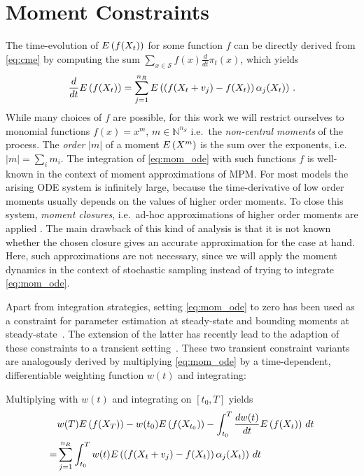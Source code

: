 \section{Moment Constraints}\label{sec:cv:moments}
The time-evolution of ${E}\left(f(X_t)\right)$ for some function $f$ can be directly derived from \eqref{eq:cme} by 
computing the sum
$\sum_{x\in\mathcal{S}}f(x)\frac{d}{dt}\pi_t(x)$, which yields 
\begin{equation}\label{eq:mom_ode}
    \frac{d}{dt}{E}\left(f(X_t)\right) = \sum_{j=1}^{n_R}{E}\left(\left(f({X_t + v_j}) - f(X_t)\right)\alpha_j(X_t)\right)\,.
\end{equation}
While many choices of $f$ are possible, for this work we will restrict ourselves to
monomial functions $f(x)=x^m$, $m\in\mathbb{N}^{n_S}$
i.e.\ the \emph{non-central moments} of the process.
The \emph{order} $\lvert m\rvert$ of a moment ${E}\left(X^m\right)$ is the sum over the exponents,
i.e.\ $\lvert m\rvert =\sum_im_i$.
The integration of \eqref{eq:mom_ode} with such functions $f$ is well-known in the context of
moment approximations of \ac{MPM}.
For most models the arising \ac{ODE} system is infinitely large, because the time-derivative of
low order moments usually depends on the values of higher order moments.
To close this system, \emph{moment closures}, i.e.\ ad-hoc approximations of higher order moments
are applied \cite{schnoerr2015comparison}.
The main drawback of this kind of analysis is that it is not known whether the chosen closure gives
an accurate approximation for the case at hand.
Here, such approximations are not necessary, since we will apply the moment dynamics in the context
of stochastic sampling instead of trying to integrate \eqref{eq:mom_ode}.

Apart from integration strategies,
setting \eqref{eq:mom_ode} to zero has been used as a constraint for parameter estimation at steady-state
\cite{backenkohler2018moment} and bounding moments at steady-state~\cite{dowdy2018bounds,ghusinga2017exact,kuntz2017rigorous}.
The extension of the latter has recently lead to the adaption of these constraints
to a transient setting~\cite{dowdy2018dynamic,sakurai2019bounding}.
These two transient constraint variants are analogously derived by multiplying \eqref{eq:mom_ode}
by a time-dependent, differentiable weighting function $w(t)$ and integrating:

Multiplying with $w(t)$ and integrating on $[t_0, T]$ yields~\cite{dowdy2018dynamic,sakurai2019bounding}
\begin{equation}\label{eq:poly_con}
\begin{split}
        & w(T){E}\left(f(X_{T})\right)
        - w(t_0){E}\left(f(X_{t_0})\right)
        - \int_{t_0}^{T}\frac{dw(t)}{dt}{E}\left(f(X_t)\right)\,dt\\
        =&\sum_{j=1}^{n_R}\int_{t_0}^{T}w(t)
        {E}\left(\left(f{(X_t + v_j)} - f(X_t)\right)\alpha_j(X_t)\right)\,dt
        \end{split}
\end{equation}

